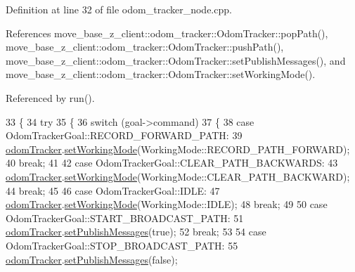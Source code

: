 Definition at line 32 of file odom\+\_\+tracker\+\_\+node.\+cpp.



References move\+\_\+base\+\_\+z\+\_\+client\+::odom\+\_\+tracker\+::\+Odom\+Tracker\+::pop\+Path(), move\+\_\+base\+\_\+z\+\_\+client\+::odom\+\_\+tracker\+::\+Odom\+Tracker\+::push\+Path(), move\+\_\+base\+\_\+z\+\_\+client\+::odom\+\_\+tracker\+::\+Odom\+Tracker\+::set\+Publish\+Messages(), and move\+\_\+base\+\_\+z\+\_\+client\+::odom\+\_\+tracker\+::\+Odom\+Tracker\+::set\+Working\+Mode().



Referenced by run().


\begin{DoxyCode}
33   \{
34     \textcolor{keywordflow}{try}
35     \{
36       \textcolor{keywordflow}{switch} (goal->command)
37       \{
38       \textcolor{keywordflow}{case} OdomTrackerGoal::RECORD\_FORWARD\_PATH:
39         \hyperlink{classOdomTrackerActionServer_a3e5c4328d3206fbd2fd2708f0aefe651}{odomTracker}.\hyperlink{classmove__base__z__client_1_1odom__tracker_1_1OdomTracker_aebeb8ff6d1f9375d855def4a33b90731}{setWorkingMode}(WorkingMode::RECORD\_PATH\_FORWARD);
40         \textcolor{keywordflow}{break};
41 
42       \textcolor{keywordflow}{case} OdomTrackerGoal::CLEAR\_PATH\_BACKWARDS:
43         \hyperlink{classOdomTrackerActionServer_a3e5c4328d3206fbd2fd2708f0aefe651}{odomTracker}.\hyperlink{classmove__base__z__client_1_1odom__tracker_1_1OdomTracker_aebeb8ff6d1f9375d855def4a33b90731}{setWorkingMode}(WorkingMode::CLEAR\_PATH\_BACKWARD);
44         \textcolor{keywordflow}{break};
45 
46       \textcolor{keywordflow}{case} OdomTrackerGoal::IDLE:
47         \hyperlink{classOdomTrackerActionServer_a3e5c4328d3206fbd2fd2708f0aefe651}{odomTracker}.\hyperlink{classmove__base__z__client_1_1odom__tracker_1_1OdomTracker_aebeb8ff6d1f9375d855def4a33b90731}{setWorkingMode}(WorkingMode::IDLE);
48         \textcolor{keywordflow}{break};
49 
50       \textcolor{keywordflow}{case} OdomTrackerGoal::START\_BROADCAST\_PATH:
51         \hyperlink{classOdomTrackerActionServer_a3e5c4328d3206fbd2fd2708f0aefe651}{odomTracker}.\hyperlink{classmove__base__z__client_1_1odom__tracker_1_1OdomTracker_af567cbb995d224a9737ec9080c7d0f09}{setPublishMessages}(\textcolor{keyword}{true});
52         \textcolor{keywordflow}{break};
53 
54       \textcolor{keywordflow}{case} OdomTrackerGoal::STOP\_BROADCAST\_PATH:
55         \hyperlink{classOdomTrackerActionServer_a3e5c4328d3206fbd2fd2708f0aefe651}{odomTracker}.\hyperlink{classmove__base__z__client_1_1odom__tracker_1_1OdomTracker_af567cbb995d224a9737ec9080c7d0f09}{setPublishMessages}(\textcolor{keyword}{false});

\end{DoxyCode}

